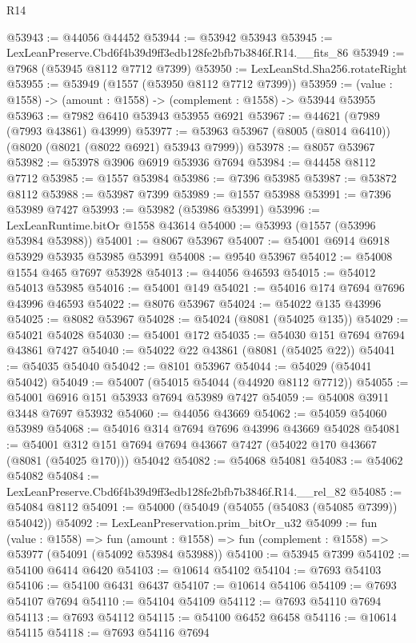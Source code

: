 \begin{lexlean}{R14}
\begin{coremodule}
@53943 := @44056 @44452
@53944 := @53942 @53943
@53945 := LexLeanPreserve.Cbd6f4b39d9ff3edb128fe2bfb7b3846f.R14.__fits_86
@53949 := @7968 (@53945 @8112 @7712 @7399)
@53950 := LexLeanStd.Sha256.rotateRight
@53955 := @53949 (@1557 (@53950 @8112 @7712 @7399))
@53959 := (value : @1558) -> (amount : @1558) -> (complement : @1558) -> @53944 @53955
@53963 := @7982 @6410 @53943 @53955 @6921
@53967 := @44621 (@7989 (@7993 @43861) @43999)
@53977 := @53963 @53967 (@8005 (@8014 @6410)) (@8020 (@8021 (@8022 @6921) @53943 @7999))
@53978 := @8057 @53967
@53982 := @53978 @3906 @6919 @53936 @7694
@53984 := @44458 @8112 @7712
@53985 := @1557 @53984
@53986 := @7396 @53985
@53987 := @53872 @8112
@53988 := @53987 @7399
@53989 := @1557 @53988
@53991 := @7396 @53989 @7427
@53993 := @53982 (@53986 @53991)
@53996 := LexLeanRuntime.bitOr @1558 @43614
@54000 := @53993 (@1557 (@53996 @53984 @53988))
@54001 := @8067 @53967
@54007 := @54001 @6914 @6918 @53929 @53935 @53985 @53991
@54008 := @9540 @53967
@54012 := @54008 @1554 @465 @7697 @53928
@54013 := @44056 @46593
@54015 := @54012 @54013 @53985
@54016 := @54001 @149
@54021 := @54016 @174 @7694 @7696 @43996 @46593
@54022 := @8076 @53967
@54024 := @54022 @135 @43996
@54025 := @8082 @53967
@54028 := @54024 (@8081 (@54025 @135))
@54029 := @54021 @54028
@54030 := @54001 @172
@54035 := @54030 @151 @7694 @7694 @43861 @7427
@54040 := @54022 @22 @43861 (@8081 (@54025 @22))
@54041 := @54035 @54040
@54042 := @8101 @53967
@54044 := @54029 (@54041 @54042)
@54049 := @54007 (@54015 @54044 (@44920 @8112 @7712))
@54055 := @54001 @6916 @151 @53933 @7694 @53989 @7427
@54059 := @54008 @3911 @3448 @7697 @53932
@54060 := @44056 @43669
@54062 := @54059 @54060 @53989
@54068 := @54016 @314 @7694 @7696 @43996 @43669 @54028
@54081 := @54001
    @312
    @151
    @7694
    @7694
    @43667
    @7427
    (@54022 @170 @43667 (@8081 (@54025 @170)))
    @54042
@54082 := @54068 @54081
@54083 := @54062 @54082
@54084 := LexLeanPreserve.Cbd6f4b39d9ff3edb128fe2bfb7b3846f.R14.__rel_82
@54085 := @54084 @8112
@54091 := @54000 (@54049 (@54055 (@54083 (@54085 @7399)) @54042))
@54092 := LexLeanPreservation.prim_bitOr_u32
@54099 := fun (value : @1558) =>
  fun (amount : @1558) => fun (complement : @1558) => @53977 (@54091 (@54092 @53984 @53988))
@54100 := @53945 @7399
@54102 := @54100 @6414 @6420
@54103 := @10614 @54102
@54104 := @7693 @54103
@54106 := @54100 @6431 @6437
@54107 := @10614 @54106
@54109 := @7693 @54107 @7694
@54110 := @54104 @54109
@54112 := @7693 @54110 @7694
@54113 := @7693 @54112
@54115 := @54100 @6452 @6458
@54116 := @10614 @54115
@54118 := @7693 @54116 @7694

\end{coremodule}
\end{lexlean}
